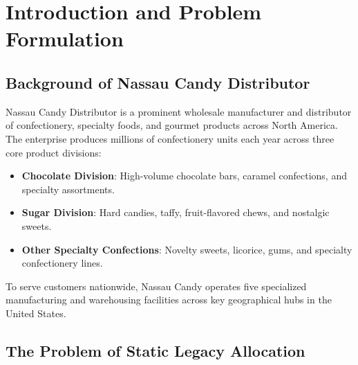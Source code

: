 \documentclass[12pt]{article}
\begin{document}
\section{Introduction and Problem Formulation}

\subsection{Background of Nassau Candy Distributor}

Nassau Candy Distributor is a prominent wholesale manufacturer and distributor of confectionery, specialty foods, and gourmet products across North America. The enterprise produces millions of confectionery units each year across three core product divisions:
\begin{itemize}
    \item \textbf{Chocolate Division}: High-volume chocolate bars, caramel confections, and specialty assortments.
    \item \textbf{Sugar Division}: Hard candies, taffy, fruit-flavored chews, and nostalgic sweets.
    \item \textbf{Other Specialty Confections}: Novelty sweets, licorice, gums, and specialty confectionery lines.
\end{itemize}

To serve customers nationwide, Nassau Candy operates five specialized manufacturing and warehousing facilities across key geographical hubs in the United States.

\subsection{The Problem of Static Legacy Allocation}
\end{document}
